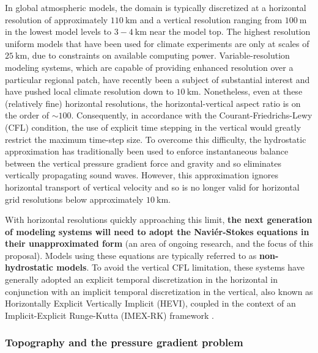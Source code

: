 \documentclass[11pt]{article}
\begin{document}
In global atmospheric models, the domain is typically discretized at a horizontal resolution of approximately $110\ \mbox{km}$ and a vertical resolution ranging from $100\ \mbox{m}$ in the lowest model levels to $3-4\ \mbox{km}$ near the model top.  The highest resolution uniform models that have been used for climate experiments are only at scales of $25\ \mbox{km}$, due to constraints on available computing power.  Variable-resolution modeling systems, which are capable of providing enhanced resolution over a particular regional patch, have recently been a subject of substantial interest and have pushed local climate resolution down to $10\ \mbox{km}$.  Nonetheless, even at these (relatively fine) horizontal resolutions, the horizontal-vertical aspect ratio is on the order of $\sim 100$.  Consequently, in accordance with the Courant-Friedrichs-Lewy (CFL) condition, the use of explicit time stepping in the vertical would greatly restrict the maximum time-step size.  To overcome this difficulty, the hydrostatic approximation has traditionally been used to enforce instantaneous balance between the vertical pressure gradient force and gravity and so eliminates vertically propagating sound waves.  However, this approximation ignores horizontal transport of vertical velocity and so is no longer valid for horizontal grid resolutions below approximately $10\ \mbox{km}$.

With horizontal resolutions quickly approaching this limit, \textbf{the next generation of modeling systems will need to adopt the Navi\'er-Stokes equations in their unapproximated form} (an area of ongoing research, and the focus of this proposal).  Models using these equations are typically referred to as \textbf{non-hydrostatic models}.  To avoid the vertical CFL limitation, these systems have generally adopted an explicit temporal discretization in the horizontal in conjunction with an implicit temporal discretization in the vertical, also known as Horizontally Explicit Vertically Implicit (HEVI), coupled in the context of an Implicit-Explicit Runge-Kutta (IMEX-RK) framework \cite{UASJRRJS1997AMM, PAUCJ2012MWR, HWSJLNW2013JCP}.


\subsubsection{Topography and the pressure gradient problem} \label{sec:TopographyPGF}
\end{document}
